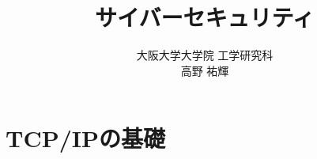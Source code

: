 \documentclass[fleqn]{jsarticle}
\title{サイバーセキュリティ}
\author{
  大阪大学大学院 工学研究科\\
  高野 祐輝
}
\date{}
\begin{document}
\maketitle

\tableofcontents










\section{TCP/IPの基礎} \label{sec:tcpip}

\end{document}
